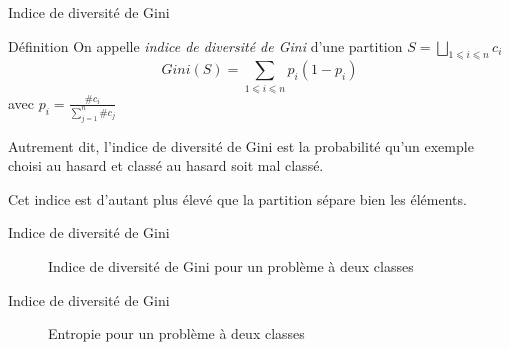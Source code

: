 \documentclass[hyperref={unicode}, xcolor={svgnames}, french]{beamer}
\begin{document}
\begin{frame}{Indice de diversité de Gini}
    \begin{block}{Définition}
        On appelle \emph{indice de diversité de Gini} d'une partition $S=⨆_{1⩽i⩽n}c_i$
        \begin{equation}
            Gini(S) = ∑_{1⩽i⩽n}p_i(1-p_i)
        \end{equation}
        avec $p_i=\frac{\#c_i}{∑_{j=1}^n\#c_j}$
    \end{block}
    Autrement dit, l'indice de diversité de Gini est la probabilité qu'un exemple choisi au hasard et classé au hasard soit mal classé.

	Cet indice est d'autant plus élevé que la partition sépare bien les éléments.
\end{frame}

\begin{frame}{Indice de diversité de Gini}
    \begin{figure}
        \tikzset{external/export=true}
        \caption{Indice de diversité de Gini pour un problème à deux classes}
    \end{figure}
\end{frame}

\begin{frame}{Indice de diversité de Gini}
    \begin{figure}
        \tikzset{external/export=true}
        \caption{Entropie pour un problème à deux classes}
    \end{figure}
\end{frame}
\end{document}
